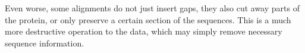 Even worse, some alignments do not just insert gaps, they also cut away parts of the protein, or only preserve a certain section of the sequences. This is a much more destructive operation to the data, which may simply remove necessary sequence information.



